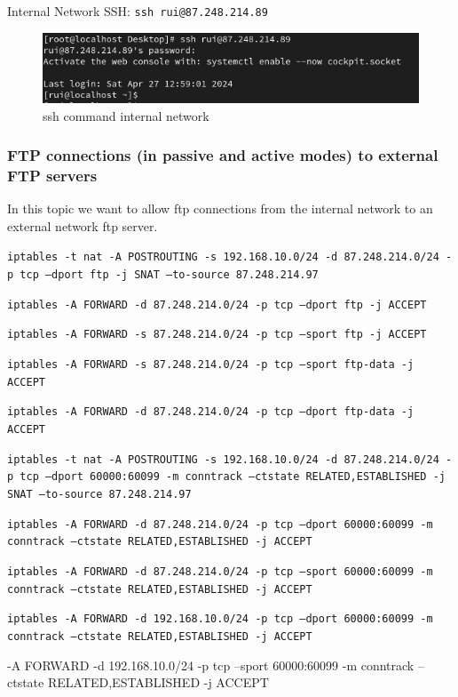\documentclass{article}
\begin{document}
\texttt{}\par
Internal Network SSH: \texttt{ssh rui@87.248.214.89} \par
\texttt{}\par
\begin{figure}[H]
    \centering
    \includegraphics[scale=0.5]{out/out_ssh_internal_to_external_sshcommand.png}
    \caption{ssh command internal network}
    \label{fig:network-arc}
\end{figure}

\subsubsection{FTP connections (in passive and active modes) to external FTP servers}
\texttt{}\par In this topic we want to allow ftp connections from the internal network to an external network ftp server.

\texttt{}\par
\texttt{iptables -t nat -A POSTROUTING -s 192.168.10.0/24 -d 87.248.214.0/24 -p tcp --dport ftp -j SNAT --to-source 87.248.214.97}\par
\texttt{iptables -A FORWARD -d 87.248.214.0/24 -p tcp --dport ftp -j ACCEPT}\par
\texttt{iptables -A FORWARD -s 87.248.214.0/24 -p tcp --sport ftp -j ACCEPT}\par
\texttt{iptables -A FORWARD -s 87.248.214.0/24 -p tcp --sport ftp-data -j ACCEPT}\par
\texttt{iptables -A FORWARD -d 87.248.214.0/24 -p tcp --dport ftp-data -j ACCEPT}\par
\texttt{iptables -t nat -A POSTROUTING -s 192.168.10.0/24 -d 87.248.214.0/24 -p tcp --dport 60000:60099 -m conntrack --ctstate RELATED,ESTABLISHED -j SNAT --to-source 87.248.214.97}\par
\texttt{iptables -A FORWARD -d 87.248.214.0/24 -p tcp --dport 60000:60099 -m conntrack --ctstate RELATED,ESTABLISHED -j ACCEPT}\par
\texttt{iptables -A FORWARD -d 87.248.214.0/24 -p tcp --sport 60000:60099 -m conntrack --ctstate RELATED,ESTABLISHED -j ACCEPT}\par
\texttt{iptables -A FORWARD -d 192.168.10.0/24 -p tcp --dport 60000:60099 -m conntrack --ctstate RELATED,ESTABLISHED -j ACCEPT}\par
\textttiptables -A FORWARD -d 192.168.10.0/24 -p tcp --sport 60000:60099 -m conntrack --ctstate RELATED,ESTABLISHED -j ACCEPT{}\par
\texttt{}\par
\end{document}

